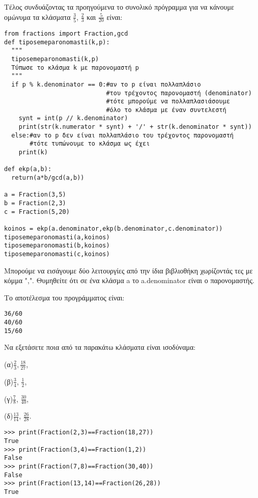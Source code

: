 Τέλος συνδυάζοντας τα προηγούμενα το συνολικό πρόγραμμα για να κάνουμε ομώνυμα τα κλάσματα $\frac{3}{5}$, $\frac{2}{3}$ και $\frac{5}{20}$ είναι:

\begin{lstlisting}
from fractions import Fraction,gcd
def tiposemeparonomasti(k,p):
  """
  tiposemeparonomasti(k,p)
  Τύπωσε το κλάσμα k με παρονομαστή p
  """
  if p % k.denominator == 0:#αν το p είναι πολλαπλάσιο
                            #του τρέχοντος παρονομαστή (denominator)
                            #τότε μπορούμε να πολλαπλασιάσουμε
                            #όλο το κλάσμα με έναν συντελεστή
    synt = int(p // k.denominator)
    print(str(k.numerator * synt) + '/' + str(k.denominator * synt))
  else:#αν το p δεν είναι πολλαπλάσιο του τρέχοντος παρονομαστή
       #τότε τυπώνουμε το κλάσμα ως έχει
    print(k)

def ekp(a,b):
  return(a*b/gcd(a,b))    
  
a = Fraction(3,5)
b = Fraction(2,3)
c = Fraction(5,20)
    
koinos = ekp(a.denominator,ekp(b.denominator,c.denominator))
tiposemeparonomasti(a,koinos)
tiposemeparonomasti(b,koinos)
tiposemeparonomasti(c,koinos)
\end{lstlisting}

Μπορούμε να εισάγουμε δύο λειτουργίες από την ίδια βιβλιοθήκη χωρίζοντάς τες με κόμμα ",".
Θυμηθείτε ότι σε ένα κλάσμα a το a.denominator είναι ο παρονομαστής.

Το αποτέλεσμα του προγράμματος είναι:

\begin{lstlisting}
36/60
40/60
15/60
\end{lstlisting}

\begin{exercise}
Να εξετάσετε ποια από τα παρακάτω κλάσματα είναι ισοδύναμα:

(α)$\frac{2}{3},\frac{18}{27}$, 

(β)$\frac{3}{4}$, $\frac{1}{2}$, 

(γ)$\frac{7}{8}$, $\frac{30}{40}$, 

(δ)$\frac{13}{14}$, $\frac{26}{28}$.
\end{exercise}

\begin{lstlisting}
>>> print(Fraction(2,3)==Fraction(18,27))
True
>>> print(Fraction(3,4)==Fraction(1,2))
False
>>> print(Fraction(7,8)==Fraction(30,40))
False
>>> print(Fraction(13,14)==Fraction(26,28))
True
\end{lstlisting}

